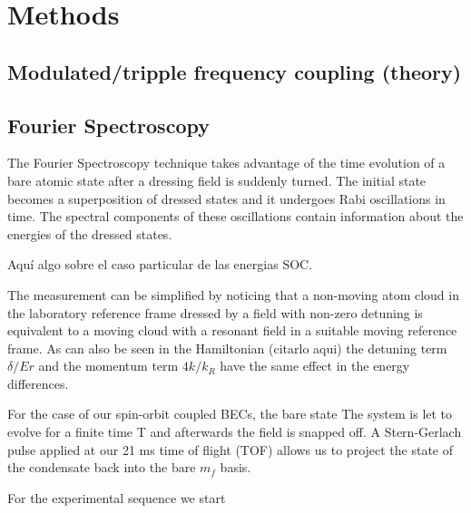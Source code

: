\section{Methods}

\subsection{Modulated/tripple frequency coupling (theory)}


\subsection{Fourier Spectroscopy}		

The Fourier Spectroscopy technique takes advantage of the time evolution of a bare atomic state after a dressing field is suddenly turned. The initial state becomes a superposition of dressed states and it undergoes Rabi oscillations in time. The spectral components of these oscillations contain information about the energies of the dressed states. 

Aquí algo sobre el caso particular de las energias SOC.

The measurement can be simplified by noticing that a non-moving atom cloud in the laboratory reference frame dressed by a field with non-zero detuning is equivalent to a moving cloud with a resonant field in a suitable moving reference frame. As can also be seen in the Hamiltonian (citarlo aqui)  the detuning term $\delta/Er$  and the momentum term $4 k/k_R$ have the same effect in the energy differences.


For the case of our spin-orbit coupled BECs, the bare state
The system is let to evolve for a finite time T and afterwards the field is snapped off. A Stern-Gerlach pulse applied at our 21 ms time of flight (TOF) allows us to project the state of the condensate back into the bare $m_f$ basis. 





For the experimental sequence we start 


